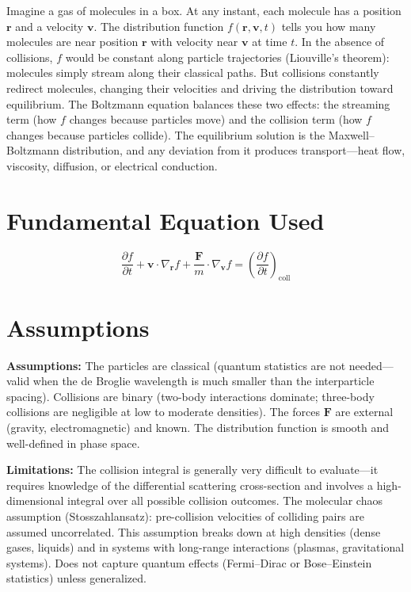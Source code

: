 \documentclass[11pt,openright]{book}
\begin{document}
Imagine a gas of molecules in a box. At any instant, each molecule has a position $\mathbf{r}$ and a velocity $\mathbf{v}$. The distribution function $f(\mathbf{r}, \mathbf{v}, t)$ tells you how many molecules are near position $\mathbf{r}$ with velocity near $\mathbf{v}$ at time $t$. In the absence of collisions, $f$ would be constant along particle trajectories (Liouville's theorem): molecules simply stream along their classical paths. But collisions constantly redirect molecules, changing their velocities and driving the distribution toward equilibrium. The Boltzmann equation balances these two effects: the streaming term (how $f$ changes because particles move) and the collision term (how $f$ changes because particles collide). The equilibrium solution is the Maxwell--Boltzmann distribution, and any deviation from it produces transport---heat flow, viscosity, diffusion, or electrical conduction.
\section*{Fundamental Equation Used}

\begin{equation}
\frac{\partial f}{\partial t} + \mathbf{v}\cdot\nabla_{\mathbf{r}} f + \frac{\mathbf{F}}{m}\cdot\nabla_{\mathbf{v}} f = \left(\frac{\partial f}{\partial t}\right)_{\text{coll}}
\end{equation}
\section*{Assumptions}

\textbf{Assumptions:} The particles are classical (quantum statistics are not needed---valid when the de Broglie wavelength is much smaller than the interparticle spacing). Collisions are binary (two-body interactions dominate; three-body collisions are negligible at low to moderate densities). The forces $\mathbf{F}$ are external (gravity, electromagnetic) and known. The distribution function is smooth and well-defined in phase space.


\textbf{Limitations:} The collision integral is generally very difficult to evaluate---it requires knowledge of the differential scattering cross-section and involves a high-dimensional integral over all possible collision outcomes. The molecular chaos assumption (Stosszahlansatz): pre-collision velocities of colliding pairs are assumed uncorrelated. This assumption breaks down at high densities (dense gases, liquids) and in systems with long-range interactions (plasmas, gravitational systems). Does not capture quantum effects (Fermi--Dirac or Bose--Einstein statistics) unless generalized.
\end{document}

